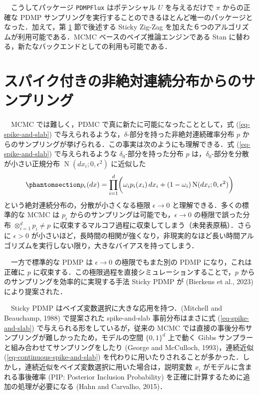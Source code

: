\documentclass[
]{article}
\theoremstyle{StatementsWithUnderline}\newtheorem{theorem}{定理}[section]\newtheorem{definition}[theorem]{定義}\newtheorem{corollary}[theorem]{系}\newtheorem{proposition}[theorem]{命題}\newtheorem{lemma}[theorem]{補題}\newtheorem{example}[theorem]{例}
\theoremstyle{definition}\newtheorem{notation}[theorem]{記法}\newtheorem{algorithm}[theorem]{算譜}\newtheorem{remarks}[theorem]{要諦}\newtheorem{remark}[theorem]{注}
\begin{document}
　こうしてパッケージ \texttt{PDMPFlux} はポテンシャル \(U\)
を与えるだけで \(\pi\) からの正確な PDMP
サンプリングを実行することのできるほとんど唯一のパッケージとなった．加えて，第
\ref{sec-3} 節で後述する Sticky Zig-Zag
を加えた６つのアルゴリズムが利用可能である．MCMC
ベースのベイズ推論エンジンである Stan
に替わる，新たなバックエンドとしての利用も可能である．

\section{スパイク付きの非絶対連続分布からのサンプリング}\label{sec-3}

　MCMC では難しく，PDMC で真に新たに可能になったこととして，式
(\ref{eq-spike-and-slab})
で与えられるような，\(\delta\)-部分を持った非絶対連続確率分布 \(p\)
からのサンプリングが挙げられる．この事実は次のようにも理解できる．式
(\ref{eq-spike-and-slab}) で与えられるような
\(\delta_0\)-部分を持った分布 \(p\)
は，\(\delta_0\)-部分を分散が小さい正規分布
\(\operatorname{N}(dx_i;0,\epsilon^2)\) に近似した
\begin{equation}\phantomsection\label{eq-continuous-spike-and-slab}{
p_\epsilon(dx)=\prod_{i=1}^d\biggr(\omega_ip_i(x_i)\,dx_i+(1-\omega_i)\operatorname{N}(dx_i;0,\epsilon^2)\biggl)
}\end{equation} という絶対連続分布の，分散が小さくなる極限
\(\epsilon\to0\) と理解できる．多くの標準的な MCMC は \(p_\epsilon\)
からのサンプリングは可能でも，\(\epsilon\to0\) の極限で誤った分布
\(\otimes_{i=1}^dp_i\ne p\)
に収束するマルコフ過程に収束してしまう（未発表原稿）．さらに
\(\epsilon>0\)
が小さいほど，長時間の相関が強くなり，非現実的なほど長い時間アルゴリズムを実行しない限り，大きなバイアスを持ってしまう．

　一方で標準的な PDMP は \(\epsilon\to0\) の極限でもまた別の PDMP
になり，これは正確に \(p\)
に収束する．この極限過程を直接シミュレーションすることで，\(p\)
からのサンプリングを効率的に実現する手法 Sticky PDMP が (Bierkens et
al., 2023) により提案された．

　Sticky PDMP はベイズ変数選択に大きな応用を持つ．(Mitchell and
Beauchamp, 1988) で提案された spike-and-slab 事前分布はまさに式
(\ref{eq-spike-and-slab}) で与えられる形をしているが，従来の MCMC
では直接の事後分布サンプリングが難しかったため，モデルの空間
\(\{0,1\}^d\) 上で動く Gibbs
サンプラーと組み合わせてサンプリングをしたり (George and McCulloch,
1993)，連続近似 (\ref{eq-continuous-spike-and-slab})
を代わりに用いたりされることが多かった．しかし，連続近似をベイズ変数選択に用いた場合は，説明変数
\(x_i\) がモデルに含まれる事後確率 (PIP: Posterior Inclusion
Probability) を正確に計算するために追加の処理が必要になる (Hahn and
Carvalho, 2015)．
\end{document}
